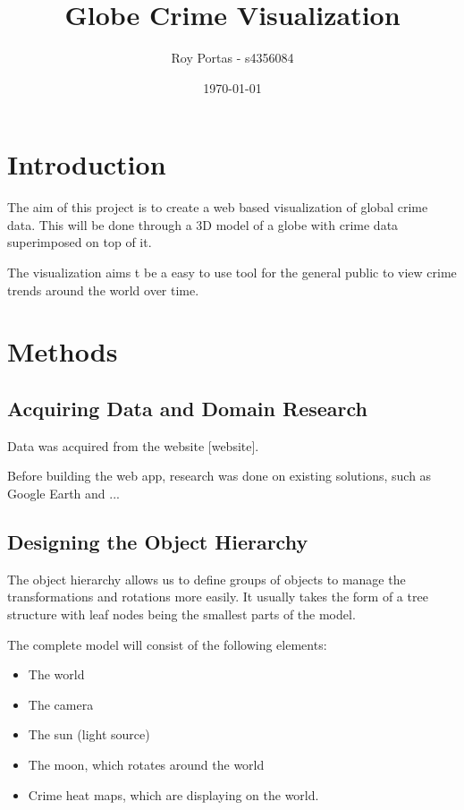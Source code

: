 \documentclass[]{article}
\begin{document}
\title{Globe Crime Visualization}
\author{Roy Portas - s4356084}
\date{\today}
\maketitle 

\section{Introduction}

The aim of this project is to create a web based visualization of global crime data.
This will be done through a 3D model of a globe with crime data superimposed on top of it.

The visualization aims t be a easy to use tool for the general public to view crime trends around the world over time.

\section{Methods}

\subsection{Acquiring Data and Domain Research}

Data was acquired from the website [website].

Before building the web app, research was done on existing solutions, such as Google Earth and ...

\subsection{Designing the Object Hierarchy}

The object hierarchy allows us to define groups of objects to manage the transformations and rotations more easily.
It usually takes the form of a tree structure with leaf nodes being the smallest parts of the model.

The complete model will consist of the following elements:

\begin{itemize}
	\item The world
    \item The camera
	\item The sun (light source)
	\item The moon, which rotates around the world
	\item Crime heat maps, which are displaying on the world.
\end{itemize}
\end{document}
